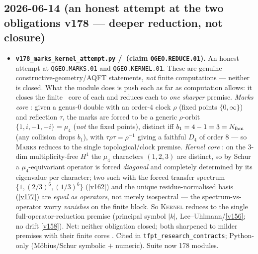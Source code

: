 \subsection*{2026-06-14 (an honest attempt at the two obligations v178 --- deeper reduction, not closure)}
\begin{itemize}
\item \textbf{\texttt{v178\_marks\_kernel\_attempt.py} \mE/\mO\ (claim \texttt{QGEO.REDUCE.01}).} An
  honest attempt at \texttt{QGEO.MARKS.01} and \texttt{QGEO.KERNEL.01}. These are genuine
  constructive-geometry/AQFT statements, \emph{not} finite computations --- neither is closed. What
  the module does is push each as far as computation allows: it closes the finite \mE\ core of each
  and reduces each to \emph{one sharper} premise. \emph{Marks core} \mE: given a genus-$0$ double with
  an order-$4$ clock $\rho$ (fixed points $\{0,\infty\}$) and reflection $\tau$, the marks are forced
  to be a generic $\rho$-orbit $\{1,i,-1,-i\}=\mu_4$ (\emph{not} the fixed points), distinct iff
  $b_1=4-1=3=N_{\mathrm{fam}}$ (any collision drops $b_1$), with $\tau\rho\tau=\rho^{-1}$ giving a faithful $D_4$
  of order $8$ --- so \textsc{Marks} reduces to the single topological/clock premise. \emph{Kernel
  core} \mE: on the $3$-dim multiplicity-free $H^1$ the $\mu_4$ characters $(1,2,3)$ are distinct, so
  by Schur a $\mu_4$-equivariant operator is forced \emph{diagonal} and completely determined by its
  eigenvalue per character; two such with the forced transfer spectrum $\{1,(2/3)^6,(1/3)^6\}$
  (\vref{v162}) and the unique residue-normalised basis (\vref{v177}) are \emph{equal as operators},
  not merely isospectral --- the spectrum-vs-operator worry \emph{vanishes} on the finite block. So
  \textsc{Kernel} reduces to the single full-operator-reduction premise (principal symbol $|k|$,
  Lee--Uhlmann/\vref{v156}; no drift \vref{v158}). Net: neither obligation closed; both sharpened to
  milder premises with their finite cores \mE. Cited in \texttt{tfpt\_research\_contracts}; Python-only
  (M\"obius/Schur symbolic $+$ numeric). Suite now 178 modules.
\end{itemize}

